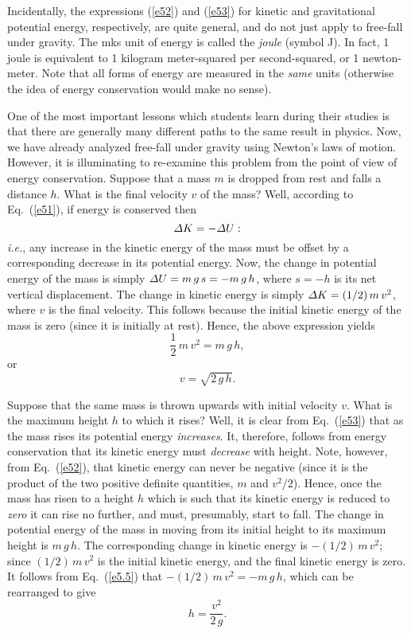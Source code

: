 Incidentally, the expressions (\ref{e52}) and (\ref{e53}) for kinetic and gravitational potential energy,
respectively, are quite general, and do not just apply to free-fall under gravity. 
The mks unit of energy is  called the {\em joule} (symbol J). In fact, 1 joule
is equivalent to 1 kilogram meter-squared per second-squared, or 1 newton-meter. Note that
all forms of energy are measured in the {\em same} units (otherwise the idea of energy conservation
would make no sense). 

One of the most important lessons which   students learn during their studies
is that there are generally many different paths to the same
result in physics. Now, we have already analyzed free-fall under gravity using Newton's
laws of motion. However, it is illuminating to re-examine this problem from the
point of view of energy conservation. Suppose that a mass $m$ is dropped from rest and
falls a distance $h$. What is the final velocity $v$ of the mass? Well,
according to Eq.~(\ref{e51}), if energy is conserved then
\begin{equation}\label{e5.5}
{\mit\Delta}K = - {\mit\Delta}U:
\end{equation}
{\em i.e.}, any increase in the kinetic energy of the mass must be offset
by a corresponding  decrease in its potential energy. Now, the change in potential
energy of the mass is simply ${\mit\Delta}U=m\,g\,s=-m\,g\,h$, where $s=-h$ is its net
vertical displacement. The change in kinetic energy is simply
${\mit\Delta}K=(1/2)\,m\,v^2$, where $v$ is the final velocity. This follows because the
initial kinetic energy of the mass is zero (since it is initially at rest). Hence,
the above expression yields
\begin{equation}
\frac{1}{2}\,m\,v^2 = m\,g\,h,
\end{equation}
or
\begin{equation}
v = \sqrt{2\,g\,h}.
\end{equation}

Suppose that the same mass is thrown upwards with initial velocity $v$. What is the
maximum height $h$ to which it rises? Well, it is clear from Eq.~(\ref{e53}) that as
the mass rises its potential energy {\em increases}. It, therefore,  follows from
energy conservation that its kinetic energy must {\em decrease} with height. Note, however,
from Eq.~(\ref{e52}), that kinetic energy can never be negative (since it
is the product of the two positive definite quantities, $m$ and $v^2/2$). Hence, once the
mass has risen to a height $h$ which is such that its kinetic energy is reduced to {\em zero} 
it can rise no further, and must, presumably, start to fall. The change in potential
energy of the mass in moving from its initial height to its maximum height is
$m\,g\,h$. The corresponding change in kinetic energy is $-(1/2)\,m\,v^2$; since
$(1/2)\,m\,v^2$ is the initial kinetic energy, and the final kinetic energy is zero.
It follows from Eq.~(\ref{e5.5}) that $-(1/2)\,m\,v^2 = -m\,g\,h$, which can be
rearranged to give
\begin{equation}
h = \frac{v^2}{2\,g}.
\end{equation}

